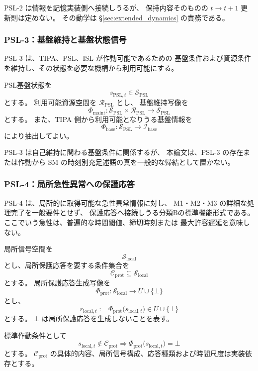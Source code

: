 \begin{remark}[記憶入力とUpdateの境界]
\label{rem:mem_input_update_boundary}
PSL-2 は情報を記憶実装側へ接続しうるが、
保持内容そのものの $t\to t+1$ 更新則は定めない。
その動学は \S\ref{sec:extended_dynamics} の責務である。
\end{remark}

\subsubsection{PSL-3：基盤維持と基盤状態信号}
\label{subsubsec:psl3}

PSL-3 は、TIPA、PSL、ISL が作動可能であるための
基盤条件および資源条件を維持し、その状態を必要な機構から利用可能にする。

\begin{definition}
\label{def:psl3}
PSL基盤状態を
\[
  s_{\mathrm{PSL},t}\in\mathcal S_{\mathrm{PSL}}
\]
とする。
利用可能資源空間を $\mathcal R_{\mathrm{PSL}}$ とし、
基盤維持写像を
\[
  \Phi_{\mathrm{maint}}:
  \mathcal S_{\mathrm{PSL}}\times\mathcal R_{\mathrm{PSL}}
  \to\mathcal S_{\mathrm{PSL}}
\]
とする。
また、TIPA 側から利用可能となりうる基盤情報を
\[
  \Phi_{\mathrm{base}}:
  \mathcal S_{\mathrm{PSL}}\to\mathcal I_{\mathrm{base}}
\]
により抽出してよい。
\end{definition}

\begin{remark}
\label{rem:psl3_sm_base}
PSL-3 は自己維持に関わる基盤条件に関係するが、
本論文は、PSL-3 の存在または作動から SM の時刻別充足述語の真を一般的な帰結として置かない。
\end{remark}

\subsubsection{PSL-4：局所急性異常への保護応答}
\label{subsubsec:psl4}

PSL-4 は、局所的に取得可能な急性異常情報に対し、
M1・M2・M3 の詳細な処理完了を一般要件とせず、
保護応答へ接続しうる分類Bの標準機能形式である。
ここでいう急性は、普遍的な時間閾値、締切時刻または
最大許容遅延を意味しない。

\begin{definition}
\label{def:psl4}
局所信号空間を
\[
  \mathcal S_{\mathrm{local}}
\]
とし、局所保護応答を要する条件集合を
\[
  \mathcal C_{\mathrm{prot}}
  \subseteq
  \mathcal S_{\mathrm{local}}
\]
とする。
局所保護応答生成写像を
\[
  \Phi_{\mathrm{prot}}:
  \mathcal S_{\mathrm{local}}
  \to
  U\cup\{\bot\}
\]
とし、
\[
  r_{\mathrm{local},t}
  :=
  \Phi_{\mathrm{prot}}
  \bigl(s_{\mathrm{local},t}\bigr)
  \in U\cup\{\bot\}
\]
とする。
$\bot$ は局所保護応答を生成しないことを表す。

標準作動条件として
\[
  s_{\mathrm{local},t}\notin\mathcal C_{\mathrm{prot}}
  \Longrightarrow
  \Phi_{\mathrm{prot}}\bigl(s_{\mathrm{local},t}\bigr)=\bot
\]
とする。
$\mathcal C_{\mathrm{prot}}$ の具体的内容、局所信号構成、応答種類および時間尺度は実装依存とする。
\end{definition}


